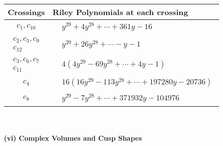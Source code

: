 \documentclass[1p]{elsarticle_modified}
\theoremstyle{definition}
\begin{document}
\begin{tabular}{m{50pt}|m{274pt}}
Crossings & \hspace{64pt}Riley Polynomials at each crossing \\
\hline $$\begin{aligned}c_{1},c_{10}\end{aligned}$$&$\begin{aligned}
&y^{29}+4 y^{28}+\cdots+361 y-16
\end{aligned}$\\
\hline $$\begin{aligned}c_{2},c_{5},c_{9}\\c_{12}\end{aligned}$$&$\begin{aligned}
&y^{29}+26 y^{28}+\cdots- y-1
\end{aligned}$\\
\hline $$\begin{aligned}c_{3},c_{6},c_{7}\\c_{11}\end{aligned}$$&$\begin{aligned}
&4(4 y^{29}-69 y^{28}+\cdots+4 y-1)
\end{aligned}$\\
\hline $$\begin{aligned}c_{4}\end{aligned}$$&$\begin{aligned}
&16(16 y^{29}-113 y^{28}+\cdots+197280 y-20736)
\end{aligned}$\\
\hline $$\begin{aligned}c_{8}\end{aligned}$$&$\begin{aligned}
&y^{29}-7 y^{28}+\cdots+371932 y-104976
\end{aligned}$\\
\hline
\end{tabular}\\~\\
\newpage\flushleft \textbf{(vi) Complex Volumes and Cusp Shapes}
\end{document}
